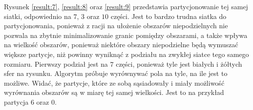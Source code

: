 Rysunek \ref{result:7}, \ref{result:8} oraz \ref{result:9} przedstawia partycjonowanie tej samej siatki, odpowiednio na
$7$, $3$ oraz $10$ części.
Jest to bardzo trudna siatka do partycjonowania, ponieważ z racji na ułożenie obszarów niepodzielnych
nie pozwala na zbytnie minimalizowanie granic pomiędzy obszarami, a także wpływa na wielkość obszarów, ponieważ niektóre
obszary niepodzielne będą wymuszać większe partycje, niż powinny wyniknąć z podziału na zwykłej siatce tego
samego rozmiaru.
Pierwszy podział jest na $7$ części, ponieważ tyle jest białych i żółtych sfer na rysunku.
Algorytm próbuje wyrównywać pola na tyle, na ile jest to możliwe.
Widać, że partycje, które ze sobą sąsiadowały i miały możliwość wyrównania obszarów są w miarę tej samej wielkości.
Jest to na przykład partycja $6$ oraz $0$.
\begin{figure}[h]
\centering
\begin{subfigure}{.33\textwidth}
    \centering
    \caption[short]{}
\end{subfigure}%
\begin{subfigure}{.33\textwidth}
    \centering

\end{subfigure}
\end{figure}
